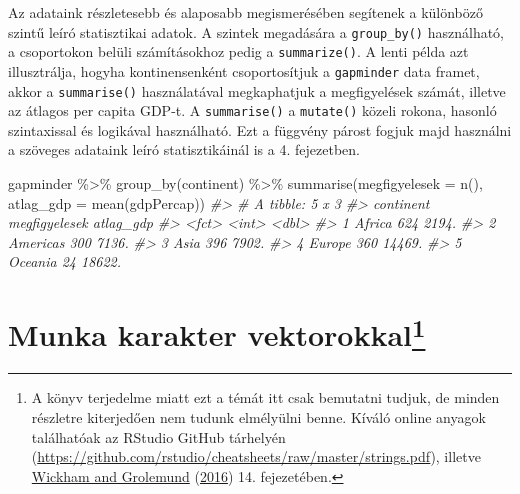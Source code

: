 \documentclass[
]{book}
\newenvironment{Shaded}{\begin{snugshade}}{\end{snugshade}}
\newcommand{\AttributeTok}[1]{\textcolor[rgb]{0.77,0.63,0.00}{#1}}
\newcommand{\CommentTok}[1]{\textcolor[rgb]{0.56,0.35,0.01}{\textit{#1}}}
\newcommand{\FunctionTok}[1]{\textcolor[rgb]{0.00,0.00,0.00}{#1}}
\newcommand{\NormalTok}[1]{#1}
\newcommand{\SpecialCharTok}[1]{\textcolor[rgb]{0.00,0.00,0.00}{#1}}
\begin{document}
Az adataink részletesebb és alaposabb megismerésében segítenek a
különböző szintű leíró statisztikai adatok. A szintek megadására a
\texttt{group\_by()} használható, a csoportokon belüli számításokhoz
pedig a \texttt{summarize()}. A lenti példa azt illusztrálja, hogyha
kontinensenként csoportosítjuk a \texttt{gapminder} data framet, akkor a
\texttt{summarise()} használatával megkaphatjuk a megfigyelések számát,
illetve az átlagos per capita GDP-t. A \texttt{summarise()} a
\texttt{mutate()} közeli rokona, hasonló szintaxissal és logikával
használható. Ezt a függvény párost fogjuk majd használni a szöveges
adataink leíró statisztikáinál is a 4. fejezetben.

\begin{Shaded}
\begin{Highlighting}[]
\NormalTok{gapminder }\SpecialCharTok{\%\textgreater{}\%}
  \FunctionTok{group\_by}\NormalTok{(continent) }\SpecialCharTok{\%\textgreater{}\%}
  \FunctionTok{summarise}\NormalTok{(}\AttributeTok{megfigyelesek =} \FunctionTok{n}\NormalTok{(), }\AttributeTok{atlag\_gdp =} \FunctionTok{mean}\NormalTok{(gdpPercap))}
\CommentTok{\#\textgreater{} \# A tibble: 5 x 3}
\CommentTok{\#\textgreater{}   continent megfigyelesek atlag\_gdp}
\CommentTok{\#\textgreater{}   \textless{}fct\textgreater{}             \textless{}int\textgreater{}     \textless{}dbl\textgreater{}}
\CommentTok{\#\textgreater{} 1 Africa              624     2194.}
\CommentTok{\#\textgreater{} 2 Americas            300     7136.}
\CommentTok{\#\textgreater{} 3 Asia                396     7902.}
\CommentTok{\#\textgreater{} 4 Europe              360    14469.}
\CommentTok{\#\textgreater{} 5 Oceania              24    18622.}
\end{Highlighting}
\end{Shaded}

\hypertarget{munka-karakter-vektorokkaladatkezeles-4}{%
\section[Munka karakter vektorokkal]{\texorpdfstring{Munka karakter
vektorokkal\footnote{A könyv terjedelme miatt ezt a témát itt csak
  bemutatni tudjuk, de minden részletre kiterjedően nem tudunk
  elmélyülni benne. Kíváló online anyagok találhatóak az RStudio GitHub
  tárhelyén
  (\url{https://github.com/rstudio/cheatsheets/raw/master/strings.pdf}),
  illetve \protect\hyperlink{ref-wickham2016r}{Wickham and Grolemund}
  (\protect\hyperlink{ref-wickham2016r}{2016}) 14. fejezetében.}}{Munka karakter vektorokkal}}\label{munka-karakter-vektorokkaladatkezeles-4}}
\end{document}
